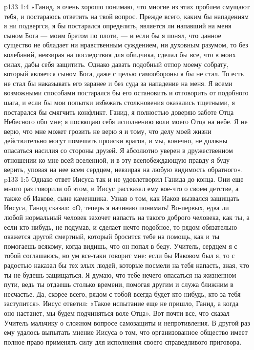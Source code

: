 \vs p133 1:4 «Ганид, я очень хорошо понимаю, что многие из этих проблем смущают тебя, и постараюсь ответить на твой вопрос. Прежде всего, каким бы нападениям я ни подвергся, я бы постарался определить, является ли напавший на меня сыном Бога --- моим братом по плоти, --- и если бы я понял, что данное существо не обладает ни нравственным суждением, ни духовным разумом, то без колебаний, невзирая на последствия для обидчика, сделал бы все, что в моих силах, дабы себя защитить. Однако давать подобный отпор моему собрату, который является сыном Бога, даже с целью самообороны я бы не стал. То есть не стал бы наказывать его заранее и без суда за нападение на меня. Я всеми возможными способами постарался бы его остановить и отговорить от подобного шага, и если бы мои попытки избежать столкновения оказались тщетными, я постарался бы смягчить конфликт. Ганид, я полностью доверяю заботе Отца Небесного обо мне; я посвящаю себя исполнению воли моего Отца на небе. Я не верю, что мне может грозить  не верю я и тому, что делу моей жизни действительно могут помешать происки врагов, и мы, конечно, не должны опасаться насилия со стороны друзей. Я абсолютно уверен в дружественном отношении ко мне всей вселенной, и в эту всепобеждающую правду я буду верить, уповая на нее всем сердцем, невзирая на любую видимость обратного».
\vs p133 1:5 Однако ответ Иисуса так и не удовлетворил Ганида до конца. Они еще много раз говорили об этом, и Иисус рассказал ему кое\hyp{}что о своем детстве, а также об Иакове, сыне каменщика. Узнав о том, как Иаков вызвался защищать Иисуса, Ганид сказал: «О, теперь я начинаю понимать! Во\hyp{}первых, едва ли любой нормальный человек захочет напасть на такого доброго человека, как ты, а если кто\hyp{}нибудь, не подумав, и сделает нечто подобное, то рядом обязательно окажется другой смертный, который бросится тебе на помощь, как и ты помогаешь всякому, когда видишь, что он попал в беду. Учитель, сердцем я с тобой соглашаюсь, но ум все\hyp{}таки говорит мне: если бы Иаковом был я, то с радостью наказал бы тех злых людей, которые посмели на тебя напасть, зная, что ты не будешь защищаться. Я думаю, что тебе нечего опасаться на жизненном пути, ведь ты отдаешь столько времени, помогая другим и служа ближним в несчастье. Да, скорее всего, рядом с тобой всегда будет кто\hyp{}нибудь, кто за тебя заступится». Иисус ответил: «Такое испытание еще не пришло, Ганид, а когда оно настанет, мы будем подчиняться воле Отца». Вот почти все, что сказал Учитель мальчику о сложном вопросе самозащиты и непротивления. В другой раз ему удалось выпытать мнение Иисуса о том, что организованное общество имеет полное право применять силу для исполнения своего справедливого приговора.
